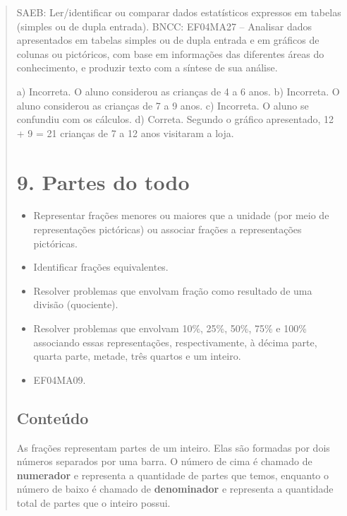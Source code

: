 \begin{enumerate}
\begin{escolha}
\begin{enumerate}
\begin{itemize}
\begin{itemize}
\begin{escolha}
\begin{quote}
\begin{escolha}
{SAEB: Ler/identificar ou comparar dados estatísticos expressos em tabelas (simples ou de dupla entrada).
BNCC: EF04MA27 -- Analisar dados apresentados em tabelas simples ou de dupla entrada e em gráficos de
colunas ou pictóricos, com base em informações das diferentes áreas do conhecimento, e produzir
texto com a síntese de sua análise.

a)  Incorreta. O aluno considerou as crianças de 4 a 6 anos.
b)  Incorreta. O aluno considerou as crianças de 7 a 9 anos.
c)  Incorreta. O aluno se confundiu com os cálculos.
d)  Correta. Segundo o gráfico apresentado, 12 + 9 = 21 crianças de 7 a 12 anos visitaram a loja.


\section{9. Partes do todo}\label{muxf3dulo-9}


\begin{itemize}
\item Representar frações menores ou maiores que a unidade (por meio de
representações pictóricas) ou associar frações a representações pictóricas.
\item Identificar frações equivalentes.
\item Resolver problemas que envolvam fração como resultado de uma divisão
(quociente).
\item Resolver problemas que envolvam 10\%, 25\%, 50\%, 75\% e 100\%
associando essas representações, respectivamente, à décima parte, quarta parte, metade,
três quartos e um inteiro.
\end{itemize}


\begin{itemize}
\item EF04MA09.
\end{itemize}


\subsection{Conteúdo}\label{conteuxfado-8}

As frações representam partes de um inteiro. Elas são formadas por dois números separados por uma barra. O número de cima é chamado de \textbf{numerador} e representa a quantidade de partes que temos, enquanto o número de baixo é chamado de \textbf{denominador} e representa a quantidade total de partes que o inteiro possui.

}
\end{escolha}
\end{quote}
\end{escolha}
\end{itemize}
\end{itemize}
\end{enumerate}
\end{escolha}
\end{enumerate}
